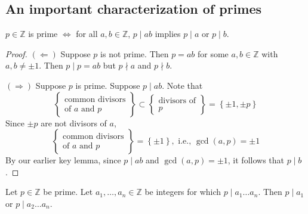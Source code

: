 \documentclass[11pt, draft]{article}
\begin{document}
\subsection{An important characterization of primes}
\begin{theorem}
    \(p \in \mathbb{Z}\) is prime \(\Leftrightarrow\) for all \(a, b \in \mathbb{Z}\), \(p \mid ab\) implies \(p \mid a\) or \(p \mid b\).
\end{theorem}

\begin{proof}
    \((\Leftarrow)\) Suppose \(p\) is not prime. Then \(p = ab\) for some \(a, b \in \mathbb{Z}\) with \(a, b \neq \pm 1\). Then \(p \mid p = ab\) but \(p \nmid a\) and \(p \nmid b\).

    \((\Rightarrow)\) Suppose \(p\) is prime. Suppose \(p \mid ab\). Note that
    \[
        \left\{
        \begin{array}{l}
            \text{common divisors} \\
            \text{of } a \text{ and } p
        \end{array}
        \right\}
        \subset
        \left\{
        \begin{array}{l}
            \text{divisors of} \\
            p
        \end{array}
        \right\}
        =
        \left\{
        \pm 1, \pm p
        \right\}
    \]
    Since \(\pm p\) are not divisors of \(a\),
    \[
        \left\{
        \begin{array}{l}
            \text{common divisors} \\
            \text{of } a \text{ and } p
        \end{array}
        \right\}
        =
        \left\{
        \pm 1
        \right\}, \text{ i.e., } \operatorname{gcd}(a, p) = \pm 1
    \]
    By our earlier key lemma, since \(p \mid ab\) and \(\operatorname{gcd}(a, p) =
    \pm 1\), it follows that \(p \mid b\).
\end{proof}
\begin{theorem}
    Let \(p \in \mathbb{Z}\) be prime. Let \(a_1, \ldots, a_n \in \mathbb{Z}\) be integers for which \(p \mid a_1 \ldots a_n\). Then \(p \mid a_1\) or \(p \mid a_2 \ldots a_n\).
\end{theorem}
\end{document}
